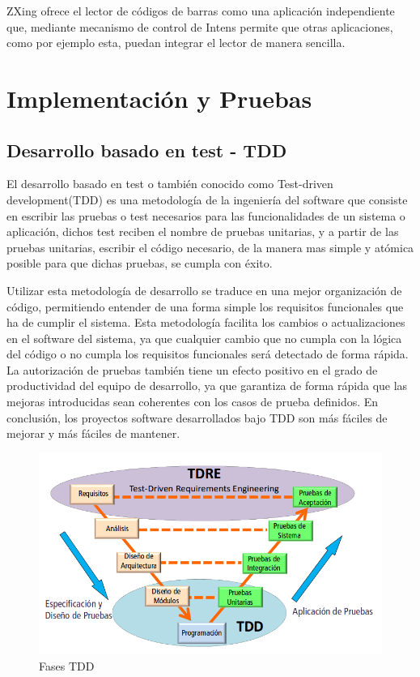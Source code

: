 \documentclass[a4paper,11pt]{book}
\begin{document}
ZXing ofrece el lector de códigos de barras como una aplicación independiente que, mediante mecanismo de control de Intens\cite{cebra2} permite que otras aplicaciones, como por ejemplo esta,  puedan integrar el lector de manera sencilla.




\chapter{Implementación y Pruebas}


\section{Desarrollo basado en test - TDD}\label{sec:TDD}

El desarrollo basado en test o también conocido como Test-driven development\cite{tdd}(TDD) es una metodología de la ingeniería del software que consiste en escribir las pruebas o test necesarios para las funcionalidades de un sistema o aplicación, dichos test reciben el nombre de pruebas unitarias, y a partir de las pruebas unitarias, escribir el código necesario, de la manera mas simple y atómica posible para que dichas pruebas, se cumpla con éxito.  


Utilizar esta metodología de desarrollo se traduce en una mejor organización de código, permitiendo entender de una forma simple los requisitos funcionales que ha de cumplir el sistema. Esta metodología facilita los cambios o actualizaciones en el software del sistema, ya que cualquier cambio que no cumpla con la lógica del código o no cumpla los requisitos funcionales será detectado de forma rápida. La autorización de pruebas también tiene un efecto positivo en el grado de productividad del equipo de desarrollo, ya que garantiza de forma rápida que las mejoras introducidas sean coherentes con los casos de prueba definidos. En conclusión, los proyectos software desarrollados bajo TDD son más fáciles de mejorar y más fáciles de mantener. 

\begin{figure}[H] 
\centering 
\includegraphics[scale=0.45]{imagenes/desarrollo_herramienta/tdd.png}
\caption{ Fases TDD\cite{tdd2}  }  
\end{figure} 
	
\end{document}
